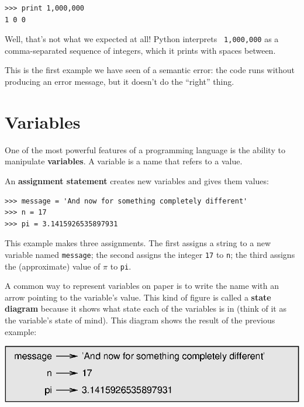 \documentclass[10pt]{book}
\begin{document}
\beforeverb
\begin{verbatim}
>>> print 1,000,000
1 0 0
\end{verbatim}
\afterverb
%
Well, that's not what we expected at all!  Python interprets {\tt
  1,000,000} as a comma-separated sequence of integers, which it
prints with spaces between.


This is the first example we have seen of a semantic error: the code
runs without producing an error message, but it doesn't do the
``right'' thing.


\section{Variables}

One of the most powerful features of a programming language is the
ability to manipulate {\bf variables}.  A variable is a name that
refers to a value.

An {\bf assignment statement} creates new variables and gives
them values:

\beforeverb
\begin{verbatim}
>>> message = 'And now for something completely different'
>>> n = 17
>>> pi = 3.1415926535897931
\end{verbatim}
\afterverb
%
This example makes three assignments.  The first assigns a string
to a new variable named {\tt message};
the second assigns the integer {\tt 17} to {\tt n}; the third
assigns the (approximate) value of $\pi$ to {\tt pi}.


A common way to represent variables on paper is to write the name with
an arrow pointing to the variable's value.  This kind of figure is
called a {\bf state diagram} because it shows what state each of the
variables is in (think of it as the variable's state of mind).
This diagram shows the result of the previous example:

\beforefig
\centerline{\includegraphics{figs/state2.eps}}
\afterfig
\end{document}
